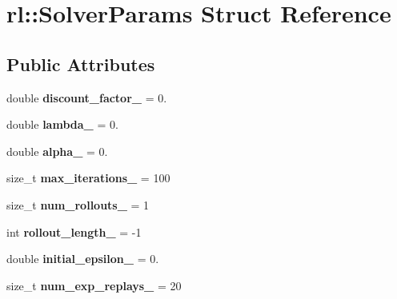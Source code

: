 \hypertarget{structrl_1_1_solver_params}{}\section{rl\+:\+:Solver\+Params Struct Reference}
\label{structrl_1_1_solver_params}
\subsection*{Public Attributes}
\begin{DoxyCompactItemize}
\item 
\hypertarget{structrl_1_1_solver_params_ae628495be6f7e8f057eb60b5d9c7fad4}{}\label{structrl_1_1_solver_params_ae628495be6f7e8f057eb60b5d9c7fad4} 
double {\bfseries discount\+\_\+factor\+\_\+} = 0.
\item 
\hypertarget{structrl_1_1_solver_params_ac8571900156cbcefdae64341a16ee1de}{}\label{structrl_1_1_solver_params_ac8571900156cbcefdae64341a16ee1de} 
double {\bfseries lambda\+\_\+} = 0.
\item 
\hypertarget{structrl_1_1_solver_params_a5e1dd6108bef14b937ba55dae3d24108}{}\label{structrl_1_1_solver_params_a5e1dd6108bef14b937ba55dae3d24108} 
double {\bfseries alpha\+\_\+} = 0.
\item 
\hypertarget{structrl_1_1_solver_params_affef10efaf1293e7024ba5ceeaee1135}{}\label{structrl_1_1_solver_params_affef10efaf1293e7024ba5ceeaee1135} 
size\+\_\+t {\bfseries max\+\_\+iterations\+\_\+} = 100
\item 
\hypertarget{structrl_1_1_solver_params_a7b5ba566ab9ce8f765467d7a956f2e5a}{}\label{structrl_1_1_solver_params_a7b5ba566ab9ce8f765467d7a956f2e5a} 
size\+\_\+t {\bfseries num\+\_\+rollouts\+\_\+} = 1
\item 
\hypertarget{structrl_1_1_solver_params_a0a07c7467520c442ef405b75f214ca2b}{}\label{structrl_1_1_solver_params_a0a07c7467520c442ef405b75f214ca2b} 
int {\bfseries rollout\+\_\+length\+\_\+} = -\/1
\item 
\hypertarget{structrl_1_1_solver_params_a19d05bfcc620af52ce595c516df4b96e}{}\label{structrl_1_1_solver_params_a19d05bfcc620af52ce595c516df4b96e} 
double {\bfseries initial\+\_\+epsilon\+\_\+} = 0.
\item 
\hypertarget{structrl_1_1_solver_params_a59f4e9853f886513cabe33ad51780202}{}\label{structrl_1_1_solver_params_a59f4e9853f886513cabe33ad51780202} 
size\+\_\+t {\bfseries num\+\_\+exp\+\_\+replays\+\_\+} = 20
\item 
\hypertarget{structrl_1_1_solver_params_a94f6b58fdc69d159a3fbfd29b1b5c884}{}\label{structrl_1_1_solver_params_a94f6b58fdc69d159a3fbfd29b1b5c884} 

\end{DoxyCompactItemize}
